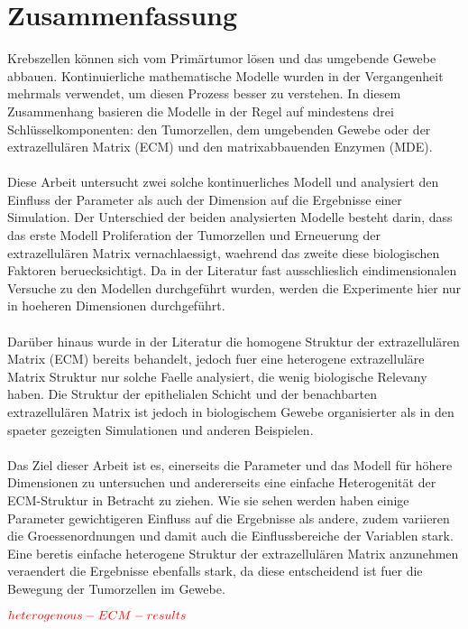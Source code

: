 \section*{Zusammenfassung}

Krebszellen können sich vom Primärtumor lösen und das umgebende Gewebe abbauen. 
Kontinuierliche mathematische Modelle wurden in der Vergangenheit mehrmals verwendet, um diesen Prozess besser zu verstehen. In diesem Zusammenhang basieren die Modelle in der Regel auf mindestens drei Schlüsselkomponenten: den Tumorzellen, dem umgebenden Gewebe oder der extrazellulären Matrix (ECM) und den matrixabbauenden Enzymen (MDE). \\ \\
Diese Arbeit untersucht zwei solche kontinuerliches Modell und analysiert den Einfluss der Parameter als auch der Dimension auf die Ergebnisse einer Simulation.
Der Unterschied der beiden analysierten Modelle besteht darin, dass das erste Modell Proliferation der Tumorzellen und Erneuerung der extrazellulären Matrix vernachlaessigt, waehrend das zweite diese biologischen Faktoren beruecksichtigt. 
Da in der Literatur fast ausschlieslich eindimensionalen Versuche zu den Modellen durchgeführt wurden, werden die Experimente hier nur in hoeheren Dimensionen durchgeführt. \\ \\
Darüber hinaus wurde in der Literatur die homogene Struktur der extrazellulären Matrix (ECM) bereits behandelt, jedoch fuer eine heterogene extrazelluläre Matrix Struktur nur solche Faelle analysiert, die wenig biologische Relevany haben. Die Struktur der epithelialen Schicht und der benachbarten extrazellulären Matrix ist jedoch in biologischem Gewebe organisierter als in den spaeter gezeigten Simulationen und anderen Beispielen. \\ \\
Das Ziel dieser Arbeit ist es, einerseits die Parameter und das Modell für höhere Dimensionen zu untersuchen und andererseits eine einfache Heterogenität der ECM-Struktur in Betracht zu ziehen. Wie sie sehen werden haben einige Parameter gewichtigeren Einfluss auf die Ergebnisse als andere, zudem variieren die Groessenordnungen und damit auch die Einflussbereiche der Variablen stark. Eine beretis einfache heterogene Struktur der extrazellulären Matrix anzunehmen veraendert die Ergebnisse ebenfalls stark, da diese entscheidend ist fuer die Bewegung der Tumorzellen im Gewebe.

$\textcolor{red}{heterogenous-ECM-results}$

